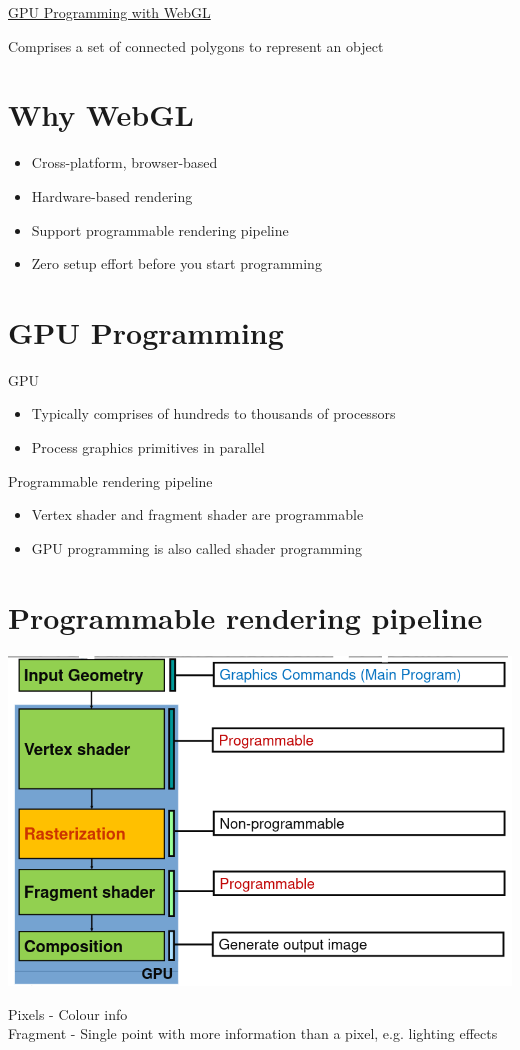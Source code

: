 \documentclass{article}[18pt]
\begin{document}
\begin{center}
\underline{\huge GPU Programming with WebGL}
\end{center}
\begin{definition}
Comprises a set of connected polygons to represent an object
\end{definition}
\section{Why WebGL}
\begin{itemize}
	\item Cross-platform, browser-based
	\item Hardware-based rendering
	\item Support programmable rendering pipeline
	\item Zero setup effort before you start programming
\end{itemize}
\section{GPU Programming}
GPU
\begin{itemize}
	\item Typically comprises of hundreds to thousands of processors
	\item Process graphics primitives in parallel
\end{itemize}
Programmable rendering pipeline
\begin{itemize}
	\item Vertex shader and fragment shader are programmable
	\item GPU programming is also called shader programming
\end{itemize}
\section{Programmable rendering pipeline}
\begin{center}
	\includegraphics[scale=0.7]{pipeline}
\end{center}
Pixels - Colour info\\
Fragment - Single point with more information than a pixel, e.g.  lighting effects
\end{document}
